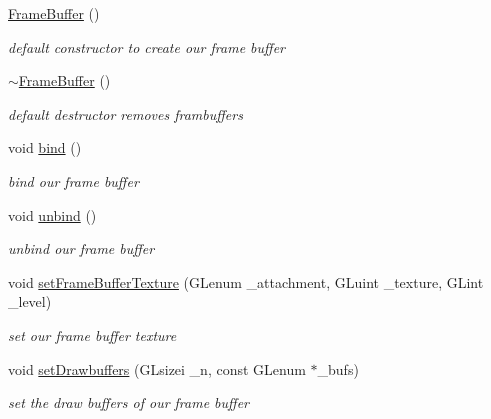 \begin{DoxyCompactItemize}
\item 
\hypertarget{class_frame_buffer_a6f3763f4551f221b86ca033e2b315c42}{\hyperlink{class_frame_buffer_a6f3763f4551f221b86ca033e2b315c42}{Frame\-Buffer} ()}\label{class_frame_buffer_a6f3763f4551f221b86ca033e2b315c42}

\begin{DoxyCompactList}\small\item\em default constructor to create our frame buffer \end{DoxyCompactList}\item 
\hypertarget{class_frame_buffer_aef8be9884e8cc0fc3f3692e6c6968fa1}{\hyperlink{class_frame_buffer_aef8be9884e8cc0fc3f3692e6c6968fa1}{$\sim$\-Frame\-Buffer} ()}\label{class_frame_buffer_aef8be9884e8cc0fc3f3692e6c6968fa1}

\begin{DoxyCompactList}\small\item\em default destructor removes frambuffers \end{DoxyCompactList}\item 
\hypertarget{class_frame_buffer_a16fa30984714c6070f4c5bde5b5b87f7}{void \hyperlink{class_frame_buffer_a16fa30984714c6070f4c5bde5b5b87f7}{bind} ()}\label{class_frame_buffer_a16fa30984714c6070f4c5bde5b5b87f7}

\begin{DoxyCompactList}\small\item\em bind our frame buffer \end{DoxyCompactList}\item 
\hypertarget{class_frame_buffer_a3b82af89f1c0c0f4c0140e41863256c0}{void \hyperlink{class_frame_buffer_a3b82af89f1c0c0f4c0140e41863256c0}{unbind} ()}\label{class_frame_buffer_a3b82af89f1c0c0f4c0140e41863256c0}

\begin{DoxyCompactList}\small\item\em unbind our frame buffer \end{DoxyCompactList}\item 
\hypertarget{class_frame_buffer_a3acf3a4afec2ebecd93fae3bfba00808}{void \hyperlink{class_frame_buffer_a3acf3a4afec2ebecd93fae3bfba00808}{set\-Frame\-Buffer\-Texture} (G\-Lenum \-\_\-attachment, G\-Luint \-\_\-texture, G\-Lint \-\_\-level)}\label{class_frame_buffer_a3acf3a4afec2ebecd93fae3bfba00808}

\begin{DoxyCompactList}\small\item\em set our frame buffer texture \end{DoxyCompactList}\item 
\hypertarget{class_frame_buffer_a399edc3b7d856ead72e5e04d73223643}{void \hyperlink{class_frame_buffer_a399edc3b7d856ead72e5e04d73223643}{set\-Drawbuffers} (G\-Lsizei \-\_\-n, const G\-Lenum $\ast$\-\_\-bufs)}\label{class_frame_buffer_a399edc3b7d856ead72e5e04d73223643}

\begin{DoxyCompactList}\small\item\em set the draw buffers of our frame buffer \end{DoxyCompactList}\end{DoxyCompactItemize}
